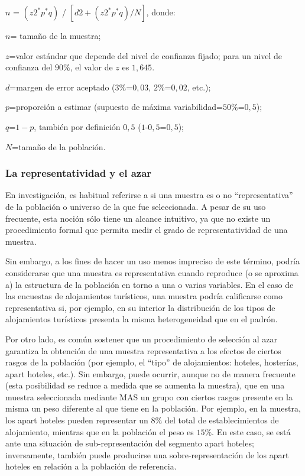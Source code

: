 \documentclass[
]{book}
\begin{document}
\(n\) = \((z2^*p^*q)\) / \([d2 + (z2^*p^*q) / N]\), donde:

\(n\)= tamaño de la muestra;

\(z\)=valor estándar que depende del nivel de confianza fijado; para un nivel de confianza del \(90\%\), el valor de \(z\) es \(1,645\).

\(d\)=margen de error aceptado (\(3\%\)=\(0,03\), \(2\%\)=\(0,02\), etc.);

\(p\)=proporción a estimar (supuesto de máxima variabilidad=\(50\%\)=\(0,5\));

\(q\)=\(1-p\), también por definición \(0,5\) (\(1\)-\(0,5\)=\(0,5\));

\(N\)=tamaño de la población.

\hypertarget{la-representatividad-y-el-azar}{%
\subsubsection{La representatividad y el azar}\label{la-representatividad-y-el-azar}}

En investigación, es habitual referirse a si una muestra es o no ``representativa'' de la población o universo de la que fue seleccionada. A pesar de su uso frecuente, esta noción sólo tiene un alcance intuitivo, ya que no existe un procedimiento formal que permita medir el grado de representatividad de una muestra.

Sin embargo, a los fines de hacer un uso menos impreciso de este término, podría considerarse que una muestra es representativa cuando reproduce (o se aproxima a) la estructura de la población en torno a una o varias variables. En el caso de las encuestas de alojamientos turísticos, una muestra podría calificarse como representativa si, por ejemplo, en su interior la distribución de los tipos de alojamientos turísticos presenta la misma heterogeneidad que en el padrón.

Por otro lado, es común sostener que un procedimiento de selección al azar garantiza la obtención de una muestra representativa a los efectos de ciertos rasgos de la población (por ejemplo, el ``tipo'' de alojamientos: hoteles, hosterías, apart hoteles, etc.). Sin embargo, puede ocurrir, aunque no de manera frecuente (esta posibilidad se reduce a medida que se aumenta la muestra), que en una muestra seleccionada mediante MAS un grupo con ciertos rasgos presente en la misma un peso diferente al que tiene en la población. Por ejemplo, en la muestra, los apart hoteles pueden representar un \(8\%\) del total de establecimientos de alojamiento, mientras que en la población el peso es \(15\%\). En este caso, se está ante una situación de sub-representación del segmento apart hoteles; inversamente, también puede producirse una sobre-representación de los apart hoteles en relación a la población de referencia.
\end{document}
